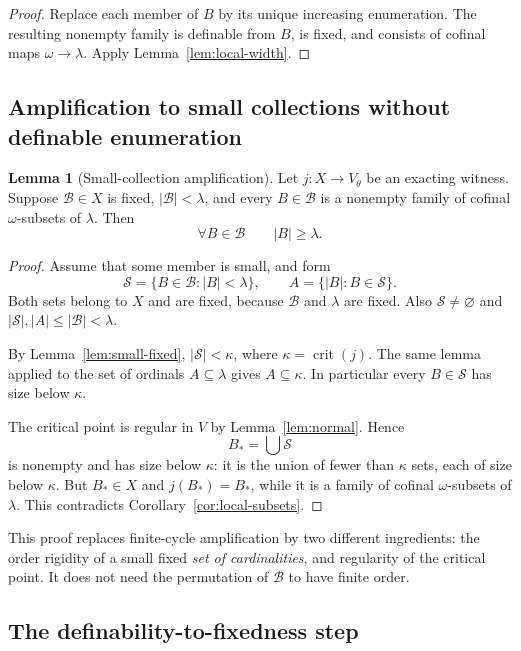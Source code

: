\documentclass[11pt,letterpaper]{article}
\theoremstyle{definition}
\newtheorem{lemma}[definition]{Lemma}
\numberwithin{equation}{section}
\newcommand{\crit}{\operatorname{crit}}
\newcommand{\Bcal}{\mathcal B}
\newcommand{\Scal}{\mathcal S}
\begin{document}
\begin{proof}
Replace each member of $B$ by its unique increasing enumeration. The resulting nonempty family is definable from $B$, is fixed, and consists of cofinal maps $\omega\to\lambda$. Apply Lemma~\ref{lem:local-width}.
\end{proof}

\subsection{Amplification to small collections without definable enumeration}

\begin{lemma}[Small-collection amplification]\label{lem:amplification}
Let $j:X\to V_\theta$ be an exacting witness. Suppose $\Bcal\in X$ is fixed, $|\Bcal|<\lambda$, and every $B\in\Bcal$ is a nonempty family of cofinal $\omega$-subsets of $\lambda$. Then
\[
\forall B\in\Bcal\qquad |B|\ge\lambda.
\]
\end{lemma}

\begin{proof}
Assume that some member is small, and form
\[
\Scal=\{B\in\Bcal:|B|<\lambda\},
\qquad A=\{|B|:B\in\Scal\}.
\]
Both sets belong to $X$ and are fixed, because $\Bcal$ and $\lambda$ are fixed. Also $\Scal\ne\varnothing$ and $|\Scal|,|A|\le|\Bcal|<\lambda$.

By Lemma~\ref{lem:small-fixed}, $|\Scal|<\kappa$, where $\kappa=\crit(j)$. The same lemma applied to the set of ordinals $A\subseteq\lambda$ gives $A\subseteq\kappa$. In particular every $B\in\Scal$ has size below $\kappa$.

The critical point is regular in $V$ by Lemma~\ref{lem:normal}. Hence
\[
B_* = \bigcup\Scal
\]
is nonempty and has size below $\kappa$: it is the union of fewer than $\kappa$ sets, each of size below $\kappa$. But $B_*\in X$ and $j(B_*)=B_*$, while it is a family of cofinal $\omega$-subsets of $\lambda$. This contradicts Corollary~\ref{cor:local-subsets}.
\end{proof}

This proof replaces finite-cycle amplification by two different ingredients: the order rigidity of a small fixed \emph{set of cardinalities}, and regularity of the critical point. It does not need the permutation of $\Bcal$ to have finite order.

\subsection{The definability-to-fixedness step}
\end{document}
